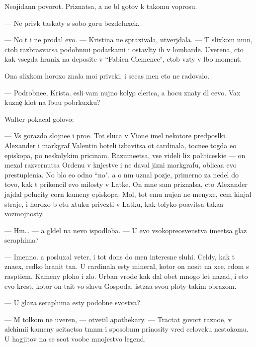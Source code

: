 \documentclass[10pt]{book}
\begin{document}
Neojidann{\yi}{\y} povorot. Priznatsa, {\y}a ne b{\yi}l gotov k takomu voprosu.

— Ne priv{\yi}k taskaty s sobo{\y} goru bezdeluxek.

— No t{\yi} i ne prodal {\y}evo. — Kristina ne spraxivala, utverjdala. — T{\yi} slixkom um{\e}n, ctob{\yi} razbras{\yi}vatsa podobn{\yi}mi podarkami i ostavl{\ia}ty ih v lombarde. Uverena, cto kak vsegda hranix na deposite v ``Fabien Clemence", ctob{\yi} vz{\ia}ty v l{\io}bo{\y} moment.

Ona slixkom horoxo znala mo{\y}i priv{\yi}cki, i se{\y}cas men{\ia} eto ne radovalo.

— Podrobne{\y}e, Krista. {\Y}esli vam nujno koly{\c}o clerica, {\y}a hocu znaty dl{\ia} cevo. Vax kuzne{\c} kl{\io}{\y}ot na l{\io}bu{\y}u pobr{\ia}kuxku?

Walter pokacal golovo{\y}:

— Vs{\e} gorazdo slojne{\y}e i pro{\x}e. Tot sluca{\y} v Vione imel nekotor{\yi}{\y}e predpos{\yi}lki. Alexander i markgraf Valentin hoteli izbavitsa ot cardinala, tocne{\y}e togda {\y}e{\x}o episkopa, po neskolykim pricinam. Razume{\y}etsa, vse videli lix politiceski{\y}e — on mexal razvernutsa Ordenu v kn{\ia}jestve i ne daval jizni markgrafu, oblica{\y}a {\y}evo prestupleni{\y}a. No b{\yi}lo {\y}e{\x}o odno ``no". {\Y}a o n{\e}m uznal pozje, primerno za nedel{\io} do tovo, kak t{\yi} prikoncil {\y}evo milosty v Latke. On mne sam priznalsa, cto Alexander jajdal polucity corn{\yi}{\y} kameny episkopa. Mol, tot {\y}emu nujen ne menyxe, cem kinjal{\yi} straje{\y}, i horoxo b{\yi} etu xtuku privezti v Latku, kak tolyko po{\y}avitsa taka{\y}a vozmojnosty.

— Hm… — {\Y}a gl{\ia}del na nevo ispodlob{\y}a. — U {\y}evo v{\yi}sokopreosv{\ia}{\x}enstva ime{\y}etsa glaz seraphima?

— Imenno. {\Y}a posluxal veter, i tot don{\e}s do men{\ia} interesn{\yi}{\y}e sluhi. Cel{\ia}dy, kak t{\yi} zna{\y}ex, redko hranit ta{\y}n{\yi}. U cardinala {\y}esty mineral, kotor{\yi}{\y} on nosit na xe{\y}e, r{\ia}dom s rasp{\ia}ti{\y}em. Kameny ploho{\y} i zlo{\y}. Urban vrode kak dal obet mnogo let nazad, i eto {\y}evo krest, kotor{\yi}{\y} on ta{\x}it vo slavu Gospoda, ist{\ia}za{\y}a svo{\y}u ploty takim obrazom.

— U glaza seraphima {\y}esty podobn{\yi}{\y}e svo{\y}stva?

— M{\yi} tolkom ne uveren{\yi}, — otvetil apothekary. — Tractat{\yi} govor{\ia}t razno{\y}e, v alchimi{\y}i kameny scita{\y}etsa t{\e}mn{\yi}m i sposobn{\yi}m prinosity vred celoveku nesto{\y}komu. U hagjitov na se{\y} scot voob{\x}e mnojestvo legend.
\end{document}
